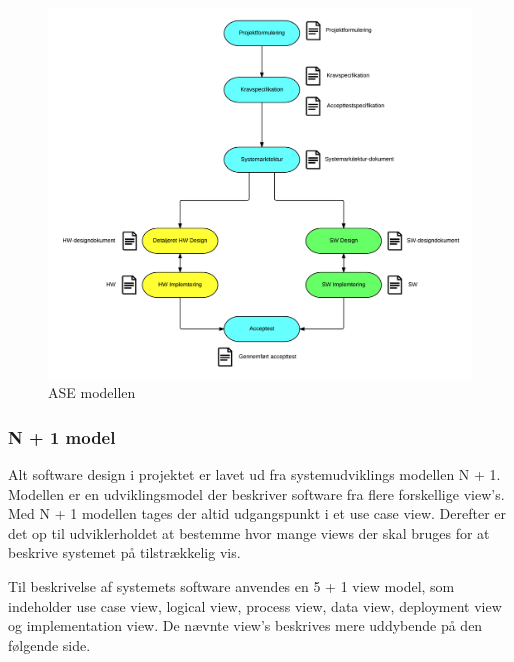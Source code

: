 \begin{figure}[H]
	\centering
	\includegraphics[width=1\textwidth]{Billeder/Udviklingsproces/ase_model}
	\caption{ASE modellen}
	\label{fig:dokument_udvikling}
\end{figure}

\newpage

\subsubsection{N + 1 model}
Alt software design i projektet er lavet ud fra systemudviklings modellen N + 1. 
Modellen er en udviklingsmodel der beskriver software fra flere forskellige view's.  
Med N + 1 modellen tages der altid udgangspunkt i et use case view. Derefter er det op til udviklerholdet at bestemme hvor mange views der skal bruges for at beskrive systemet på tilstrækkelig vis. 

Til beskrivelse af systemets software anvendes en 5 + 1 view model, som indeholder use case view, logical view, process view, data view, deployment view og implementation view. De nævnte view's beskrives mere uddybende på den følgende side. 

